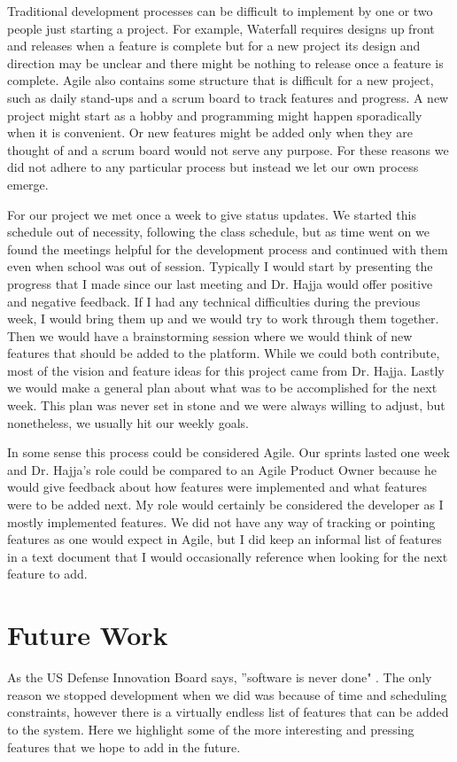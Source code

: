 \documentclass{article}
\begin{document}
    Traditional development processes can be difficult to implement by one or two people just starting a project. For example, Waterfall requires designs up front and releases when a feature is complete but for a new project its design and direction may be unclear and there might be nothing to release once a feature is complete. Agile also contains some structure that is difficult for a new project, such as daily stand-ups and a scrum board to track features and progress. A new project might start as a hobby and programming might happen sporadically when it is convenient. Or new features might be added only when they are thought of and a scrum board would not serve any purpose. For these reasons we did not adhere to any particular process but instead we let our own process emerge.
    \smallskip
    
    For our project we met once a week to give status updates. We started this schedule out of necessity, following the class schedule, but as time went on we found the meetings helpful for the development process and continued with them even when school was out of session. Typically I would start by presenting the progress that I made since our last meeting and Dr. Hajja would offer positive and negative feedback. If I had any technical difficulties during the previous week, I would bring them up and we would try to work through them together. Then we would have a brainstorming session where we would think of new features that should be added to the platform. While we could both contribute, most of the vision and feature ideas for this project came from Dr. Hajja. Lastly we would make a general plan about what was to be accomplished for the next week. This plan was never set in stone and we were always willing to adjust, but nonetheless, we usually hit our weekly goals.
    \smallskip
    
    In some sense this process could be considered Agile. Our sprints lasted one week and Dr. Hajja's role could be compared to an Agile Product Owner because he would give feedback about how features were implemented and what features were to be added next. My role would certainly be considered the developer as I mostly implemented features. We did not have any way of tracking or pointing features as one would expect in Agile, but I did keep an informal list of features in a text document that I would occasionally reference when looking for the next feature to add.
    
\section{Future Work}\label{future-work}
    As the US Defense Innovation Board says, ''software is never done" \cite{mcquade}. The only reason we stopped development when we did was because of time and scheduling constraints, however there is a virtually endless list of features that can be added to the system. Here we highlight some of the more interesting and pressing features that we hope to add in the future.
    \\\\
    \smallskip
    
\end{document}

